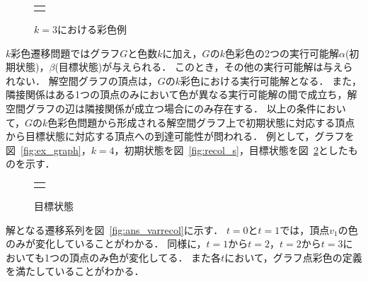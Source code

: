 \begin{figure}[htbp]
  \centering
  \begin{tabular}{c}
    
    \begin{minipage}{0.45\hsize}
      \centering
      
      \caption{グラフ}
      \label{fig:ex_graph}
    \end{minipage}

    \begin{minipage}{0.45\hsize}
      \centering
      
      \caption{$k=3$における彩色例}
      \label{fig:graph_col}
    \end{minipage}

  \end{tabular}  
\end{figure}

$k$彩色遷移問題ではグラフ$G$と色数$k$に加え，$G$の$k$色彩色の2つの実行可能解$\alpha$(初期状態)，$\beta$(目標状態)が与えられる． 
このとき，その他の実行可能解は与えられない． 
解空間グラフの頂点は，$G$の$k$彩色における実行可能解となる．
また，隣接関係はある1つの頂点のみにおいて色が異なる実行可能解の間で成立ち，解空間グラフの辺は隣接関係が成立つ場合にのみ存在する．
以上の条件において，$G$の$k$色彩色問題から形成される解空間グラフ上で初期状態に対応する頂点から目標状態に対応する頂点への到達可能性が問われる． 
例として，グラフを図~\ref{fig:ex_graph}，$k=4$，初期状態を図~\ref{fig:recol_s}，目標状態を図~\ref{fig:recol_g}としたものを示す．

\begin{figure}[htbp]
  \centering
  \begin{tabular}{c}

    \begin{minipage}{0.45\hsize}
      \centering
      
      \caption{初期状態}
      \label{fig:recol_s}
    \end{minipage}

    \begin{minipage}{0.45\hsize}
      \centering
      
      \caption{目標状態}
      \label{fig:recol_g}
    \end{minipage}
    
  \end{tabular}
\end{figure}

\noindent
解となる遷移系列を図~\ref{fig:ans_varrecol}に示す． $t=0$と$t=1$では，頂点$v_1$の色のみが変化していることがわかる． 
同様に，$t=1$から$t=2$，$t=2$から$t=3$においても1つの頂点のみ色が変化してる． 
また各$t$において，グラフ点彩色の定義を満たしていることがわかる．

